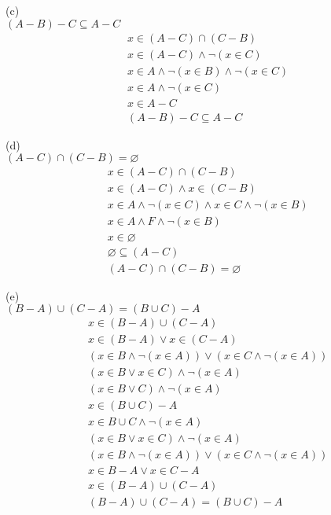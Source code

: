 \documentclass[12pt]{article}
\begin{document}
(c)\\
$(A-B)-C\subseteq A-C$\\
\begin{equation}\nonumber
    \begin{split}
    &x\in (A-C)\cap (C-B)\\
    &x\in (A-C)\land \lnot (x\in C)\\
    &x\in A\land \lnot (x\in B)\land \lnot (x\in C)\\
    &x\in A\land \lnot (x\in C)\\
    &x\in A-C\\
    &(A-B)-C\subseteq A-C
    \end{split}
\end{equation}

(d)\\
$(A-C)\cap (C-B)=\varnothing $\\
\begin{equation}\nonumber
    \begin{split}
    &x\in (A-C)\cap (C-B)\\
    &x\in (A-C)\land x\in (C-B)\\
    &x\in A\land \lnot (x\in C)\land x\in C\land \lnot (x\in B)\\
    &x\in A\land F\land \lnot (x\in B)\\
    &x\in \varnothing\\
    &\varnothing\subseteq (A-C)\\
    &(A-C)\cap (C-B)=\varnothing
    \end{split}
\end{equation}

(e)\\
$(B-A)\cup (C-A)=(B\cup C)-A$\\
\begin{equation}\nonumber
    \begin{split}
    &x\in(B-A)\cup (C-A)\\
    &x\in(B-A) \lor x\in (C-A)\\
    &(x\in B\land \lnot (x\in A))\lor (x\in C\land \lnot (x\in A))\\
    &(x\in B\lor x\in C)\land \lnot (x\in A)\\
    &(x\in B\lor C)\land \lnot (x\in A)\\
    &x\in(B\cup C)-A\\
    &x\in B\cup C\land \lnot (x\in A)\\
    &(x\in B \lor x\in C)\land \lnot (x\in A)\\
    &(x\in B\land \lnot (x\in A))\lor (x\in C \land \lnot (x\in A))\\
    &x\in B-A\lor x\in C-A\\
    &x\in (B-A)\cup(C-A)\\
    &(B-A)\cup (C-A)=(B\cup C)-A
    \end{split}
\end{equation}
\end{document}
